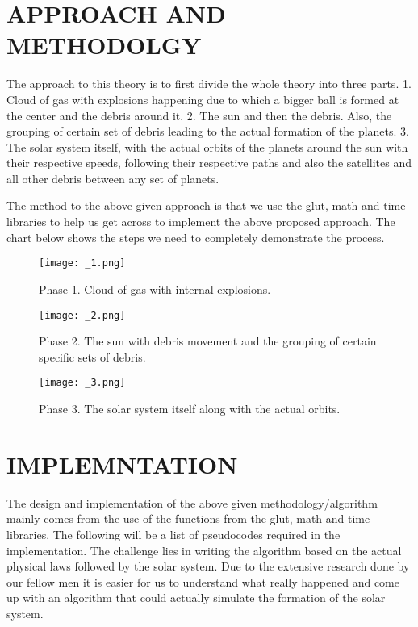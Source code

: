 \documentclass[letterpaper, 10 pt, conference]{ieeeconf}  %
\begin{document}
\section{APPROACH AND METHODOLGY}
The approach to this theory is to first divide the whole theory into three parts.
1. Cloud of gas with explosions happening due to which a bigger ball is formed at the center and the debris around it.
2. The sun and then the debris. Also, the grouping of certain set of debris leading to the actual formation of the planets.
3. The solar system itself, with the actual orbits  of the planets around the sun with their respective speeds, following their respective paths and also the satellites and all other debris between any set of planets.

The method to the above given approach is that we use the glut, math and time libraries to help us get across to implement the above proposed approach. The chart below shows the steps we need to completely demonstrate the process.
\begin{figure}[H]
  \begin{center}
    \texttt{[image: \_1.png]}
  \end{center}
  \caption{Phase 1. Cloud of gas with internal explosions.}
\end{figure}


\begin{figure}[H]
  \begin{center}
    \texttt{[image: \_2.png]}
  \end{center}
  \caption{Phase 2. The sun with debris movement and the grouping of certain specific sets of debris.}
\end{figure}

\begin{figure}[H]
  \begin{center}
    \texttt{[image: \_3.png]}
  \end{center}
  \caption{Phase 3. The solar system itself along with the actual orbits.}
\end{figure}
\section{IMPLEMNTATION}
The design and implementation of the above given methodology/algorithm mainly comes from the use of the functions from the glut, math and time libraries. The following will be a list of pseudocodes required in the implementation. The challenge lies in writing the algorithm based on the actual physical laws followed by the solar system. Due to the extensive research done by our fellow men it is easier for us to understand what really happened and come up with an algorithm that could actually simulate the formation of the solar system.
\end{document}
